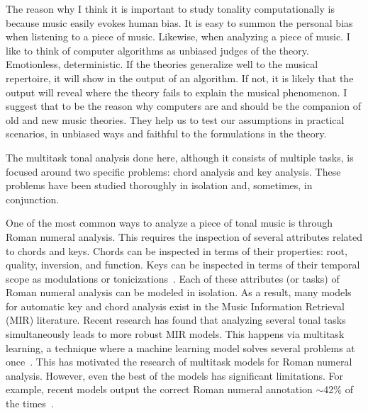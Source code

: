The reason why I think it is important to study tonality
computationally is because music easily evokes human bias.
It is easy to summon the personal bias when listening to a
piece of music. Likewise, when analyzing a piece of music. I
like to think of computer algorithms as unbiased judges of
the theory. Emotionless, deterministic. If the theories
generalize well to the musical repertoire, it will show in
the output of an algorithm. If not, it is likely that the
output will reveal where the theory fails to explain the
musical phenomenon.
I suggest that to be the reason why computers are and should
be the companion of old and new music theories. They help us
to test our assumptions in practical scenarios, in unbiased
ways and faithful to the formulations in the theory.

The multitask tonal analysis done here, although it consists
of multiple tasks, is focused around two specific problems:
chord analysis and key analysis. These problems have been
studied thoroughly in isolation and, sometimes, in
conjunction.


One of the most common ways to analyze a piece of tonal
music is through Roman numeral analysis. This requires the
inspection of several attributes related to chords and keys.
Chords can be inspected in terms of their properties: root,
quality, inversion, and function. Keys can be inspected in
terms of their temporal scope as modulations or
tonicizations~\parencite{napoleslopez2020local}. Each of
these attributes (or tasks) of Roman numeral analysis can be
modeled in isolation. As a result, many models for automatic
key and chord analysis exist in the Music Information
Retrieval (MIR) literature. Recent research has found that
analyzing several tonal tasks simultaneously leads to more
robust MIR models. This happens via multitask learning, a
technique where a machine learning model solves several
problems at once~\parencite{ruder2017overview}. This has
motivated the research of multitask models for Roman numeral
analysis. However, even the best of the models has
significant limitations. For example, recent models output
the correct Roman numeral annotation $\sim$42\% of the
times~\parencite{chen2021attend, micchi2020not}.


